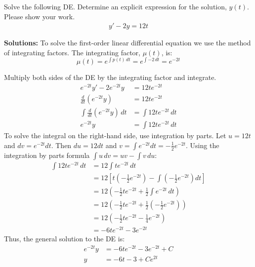 \ifnum {}
\question[5] Solve the following DE. Determine an explicit expression for the solution, $y(t)$. Please show your work. 
\begin{align*}
    y'-2y=12t
\end{align*}
\ifnum {} {\color{DarkBlue} 
\textbf{Solutions:} To solve the first-order linear differential equation we use the method of integrating factors. The integrating factor, \( \mu(t) \), is:
\[
\mu(t) = e^{\int p(t) \, dt} = e^{\int -2 \, dt} = e^{-2t}
\]

Multiply both sides of the DE by the integrating factor and integrate. 
\begin{align}
e^{-2t} y' - 2 e^{-2t} y &= 12t e^{-2t}\\
\frac{d}{dt} \left( e^{-2t} y \right) &= 12t e^{-2t}\\
\int \frac{d}{dt} \left( e^{-2t} y \right) \, dt &= \int 12t e^{-2t} \, dt\\
e^{-2t} y &= \int 12t e^{-2t} \, dt
\end{align}
To solve the integral on the right-hand side, use integration by parts. Let \( u = 12t \) and \( dv = e^{-2t} dt \). Then \( du = 12 dt \) and \( v = \int e^{-2t} dt = -\frac{1}{2} e^{-2t} \). Using the integration by parts formula \(\int u \, dv = uv - \int v \, du\):
\begin{align}
    \int 12t e^{-2t} \, dt &= 12 \int t e^{-2t} \, dt \\
&= 12 \left[ t \left( -\frac{1}{2} e^{-2t} \right) - \int \left( -\frac{1}{2} e^{-2t} \right) dt \right]\\
&= 12 \left( -\frac{1}{2} t e^{-2t} + \frac{1}{2} \int e^{-2t} \, dt \right)\\
&= 12 \left( -\frac{1}{2} t e^{-2t} + \frac{1}{2} \left( -\frac{1}{2} e^{-2t} \right) \right)\\
&= 12 \left( -\frac{1}{2} t e^{-2t} - \frac{1}{4} e^{-2t} \right)\\
&= -6t e^{-2t} - 3 e^{-2t}
\end{align}
Thus, the general solution to the DE is:
\begin{align}
    e^{-2t} y &= -6t e^{-2t} - 3 e^{-2t} + C\\
y &= -6t - 3 + Ce^{2t}
\end{align}

} 
\else 
\fi
\fi